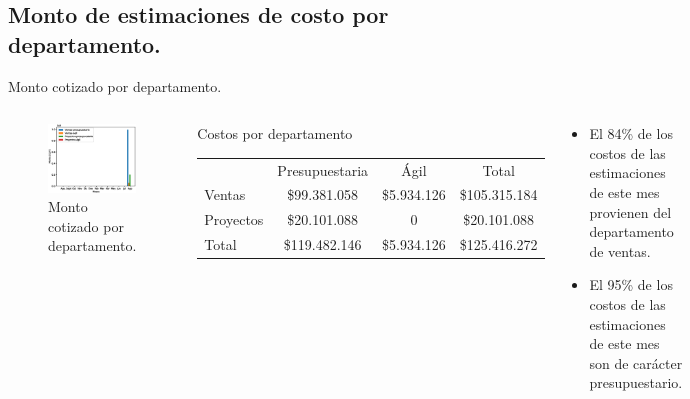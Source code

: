 \documentclass[aspectratio=169,xcolor=dvipsnames]{beamer}
\begin{document}
\subsection{Monto de estimaciones de costo por departamento.}
\begin{frame}{Monto cotizado por departamento.}
\begin{columns}[c]
\begin{figure}
     \includegraphics[width=1\textwidth]{EPS/monto_cotizaciones_departamento_tipo.eps}
     \caption{Monto cotizado por departamento.}
     \label{graph:cantidad_cotizaciones_departamento_tipo}
\end{figure}
 \begin{block}{Costos por departamento}
     \begin{tabular}{lccc}
                    &Presupuestaria&Ágil & Total\\
          Ventas &\$99.381.058 &\$5.934.126 & \$105.315.184\\
          Proyectos&\$20.101.088&0 &\$20.101.088\\ \hline
          Total& \$119.482.146& \$5.934.126  & \$125.416.272\\
     \end{tabular}
\end{block}
\begin{block}{}
   \begin{itemize}
       \item El 84\% de los costos de las estimaciones de este mes provienen del departamento de ventas.
       \item El 95\% de los costos de las estimaciones de este mes son de carácter presupuestario. 
   \end{itemize}
\end{block} 

\end{columns}
\end{frame}
\end{document}
